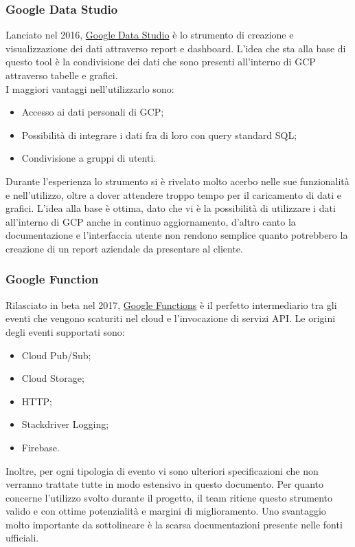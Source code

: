 \subsubsection{Google Data Studio}
Lanciato nel 2016, \href{https://datastudio.google.com/overview}{Google Data Studio} è lo strumento di creazione e visualizzazione dei dati attraverso report e dashboard. L'idea che sta alla base di questo tool è la condivisione dei dati che sono presenti all'interno di GCP attraverso tabelle e grafici.
\\ I maggiori vantaggi nell'utilizzarlo sono:
\begin{itemize}
	\item Accesso ai dati personali di GCP;
	\item Possibilità di integrare i dati fra di loro con query standard SQL;
	\item Condivisione a gruppi di utenti. 
\end{itemize}
Durante l'esperienza lo strumento si è rivelato molto acerbo nelle sue funzionalità e nell'utilizzo, oltre a dover attendere troppo tempo per il caricamento di dati e grafici. L'idea alla base è ottima, dato che vi è la possibilità di utilizzare i dati all'interno di GCP anche in continuo aggiornamento, d'altro canto la documentazione e l'interfaccia utente non rendono semplice quanto potrebbero la creazione di un report aziendale da presentare al cliente.
\subsubsection{Google Function}
Rilasciato in beta nel 2017, \href{https://cloud.google.com/functions/}{Google Functions} è il perfetto intermediario tra gli eventi che vengono scaturiti nel cloud e l'invocazione di servizi API. Le origini degli eventi supportati sono:
\begin{itemize}
	\item Cloud Pub/Sub;
	\item Cloud Storage;
	\item HTTP;
	\item Stackdriver Logging;
	\item Firebase. 
\end{itemize}
Inoltre, per ogni tipologia di evento vi sono ulteriori specificazioni che non verranno trattate tutte in modo estensivo in questo documento.
Per quanto concerne l'utilizzo svolto durante il progetto, il team ritiene questo strumento valido e con ottime potenzialità e margini di miglioramento. Uno svantaggio molto importante da sottolineare è la scarsa documentazioni presente nelle fonti ufficiali.
